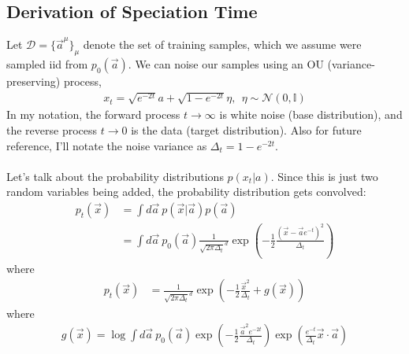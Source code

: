 \documentclass[12pt,fleqn]{article}
\numberwithin{equation}{section} %
\begin{document}
\subsection{Derivation of Speciation Time}
Let $\mathcal D = \{\vec a^\mu\}_\mu$ denote the set of training samples, which we assume were sampled iid from $p_0(\vec a)$. We can noise our samples using an OU (variance-preserving) process,
\begin{align}
	x_t = \sqrt{e^{-2t}} a + \sqrt{1-e^{-2t}} \eta, ~~ \eta \sim \mathcal N(0, \mathbb I)
\end{align}
In my notation, the forward process $t \to \infty$ is white noise (base distribution), and the reverse process $t \to 0$ is the data (target distribution). Also for future reference, I'll notate the noise variance as $\Delta_t = 1- e^{-2t}$.\\
\\
Let's talk about the probability distributions $p(x_t | a)$.  Since this is just two random variables being added, the probability distribution gets convolved:
\begin{align}
	p_t(\vec x) & = \int d\vec a ~p(\vec x | \vec a) p(\vec a)  \\
	& = \int d \vec a ~ p_0(\vec a)  \frac{1}{\sqrt{2\pi \Delta_t}^d} \exp \left (- \frac{1}{2} \frac{(\vec x - \vec a e^{-t})^2}{\Delta_t} \right)
\end{align}
where 
\begin{align}
	p_t(\vec x)  & = \frac{1}{\sqrt{2\pi \Delta_t}^d} \exp \left ( - \frac{1}{2} \frac{\vec x^2}{\Delta_t} + g(\vec x) \right)
\end{align}
where
\begin{align}
	g(\vec x) = \log \int d\vec a~ p_0(\vec a) \exp \left (- \frac{1}{2} \frac{\vec a^2 e^{-2t}}{\Delta_t} \right) \exp \left( \frac{e^{-t}}{\Delta_t} \vec x \cdot \vec a\right)
\end{align}
\end{document}
